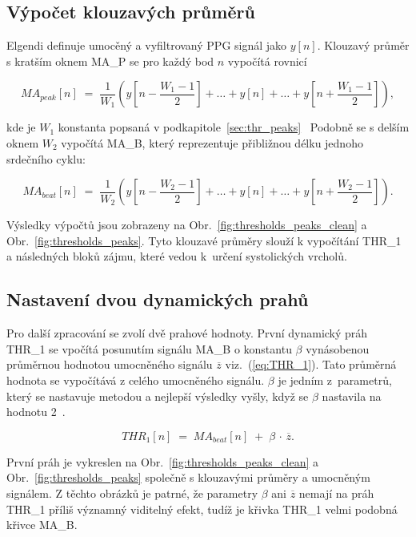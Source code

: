 \subsection*{Výpočet klouzavých průměrů} %
\label{sec:MA}

Elgendi definuje umocěný a vyfiltrovaný \acs{PPG} signál jako \(y[n]\).
Klouzavý průměr s kratším oknem \acs{MA_P} se pro každý bod \(n\) vypočítá rovnicí

\begin{equation}
	MA_{peak}[n] \;=\;
	\frac{1}{W_1}
	(y[n - \frac{W_1-1}{2}] + \ldots + y[n] + \ldots + y[n + \frac{W_1-1}{2}]),
	\label{eq:MA_P}
\end{equation}

kde je \(W_1\) konstanta popsaná v podkapitole~\ref{sec:thr_peaks}~\cite{Elgendi2013}
Podobně se s delším oknem \(W_2\) vypočítá \acs{MA_B}, který reprezentuje přibližnou délku jednoho srdečního cyklu:

\begin{equation}
	MA_{beat}[n] \;=\;
	\frac{1}{W_2}
	(y[n - \frac{W_2-1}{2}] + \ldots + y[n] + \ldots + y[n + \frac{W_2-1}{2}]).
	\label{eq:MA_B}
\end{equation}

Výsledky výpočtů jsou zobrazeny na Obr.~\ref{fig:thresholds_peaks_clean} a Obr.~\ref{fig:thresholds_peaks}.
Tyto klouzavé průměry slouží k vypočítání \acs{THR_1} a následných bloků zájmu, které vedou k~určení systolických vrcholů.

\subsection*{Nastavení dvou dynamických prahů}
\label{sec:thresholds}

Pro další zpracování se zvolí dvě prahové hodnoty.
První dynamický práh \acs{THR_1} se vpočítá posunutím signálu \acs{MA_B} o konstantu \(\beta\) vynásobenou průměrnou hodnotou umocněného signálu \(\overline{z}\) viz.~(\ref{eq:THR_1}).
Tato průměrná hodnota se vypočítává z celého umocněného signálu.
\(\beta\) je jedním z~parametrů, který se nastavuje metodou  a nejlepší výsledky vyšly, když se \(\beta\) nastavila na hodnotu 2~\cite{Elgendi2013}.

\begin{equation}
	THR_1[n] \;=\; MA_{beat}[n] \;+\; \beta \,\cdot\, \overline{z}.
	\label{eq:THR_1}
\end{equation}

První práh je vykreslen na Obr.~\ref{fig:thresholds_peaks_clean} a Obr.~\ref{fig:thresholds_peaks} společně s klouzavými průměry a umocněným signálem.
Z těchto obrázků je patrné, že parametry \(\beta\) ani \(\overline{z}\) nemají na práh \acs{THR_1} příliš významný viditelný efekt, tudíž je křivka \acs{THR_1} velmi podobná křivce \acs{MA_B}.

